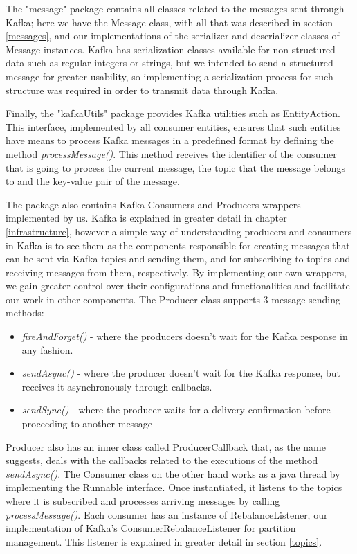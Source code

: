\documentclass[12pt]{article}
\begin{document}
The "message" package contains all classes related to the messages sent through Kafka; here we have the Message class, with all that was described in section 
\ref{messages}, and our implementations of the serializer and deserializer classes of Message instances.
Kafka has serialization classes available for non-structured data such as regular integers or strings, but we intended to send a structured message for greater 
usability, so implementing a serialization process for such structure was required in order to transmit data through Kafka.

Finally, the "kafkaUtils" package provides Kafka utilities such as EntityAction.
This interface, implemented by all consumer entities, ensures that such entities have means to process Kafka messages in a predefined format by defining the 
method \textit{processMessage()}.
This method receives the identifier of the consumer that is going to process the current message, the topic that the message belongs to and the key-value pair of 
the message.

The package also contains Kafka Consumers and Producers wrappers implemented by us.
Kafka is explained in greater detail in chapter \ref{infrastructure}, however a simple way of understanding producers and consumers in Kafka is to see them as 
the components responsible for creating messages that can be sent via Kafka topics and sending them, and for subscribing to topics and receiving messages from them,
respectively.
By implementing our own wrappers, we gain greater control over their configurations and functionalities and facilitate our work in other components.
The Producer class supports 3 message sending methods:
\vspace{-10pt}
\begin{itemize}[noitemsep]
  \item \textit{fireAndForget()} - where the producers doesn't wait for the Kafka response in any fashion.
  \item \textit{sendAsync()} - where the producer doesn't wait for the Kafka response, but receives it asynchronously through callbacks.
  \item \textit{sendSync()} - where the producer waits for a delivery confirmation before proceeding to another message
\end{itemize}
\vspace{-10pt}
Producer also has an inner class called ProducerCallback that, as the name suggests, deals with the callbacks related to the executions of the method \textit{sendAsync()}.
The Consumer class on the other hand works as a java thread by implementing the Runnable interface.
Once instantiated, it listens to the topics where it is subscribed and processes arriving messages by calling \textit{processMessage()}.
Each consumer has an instance of RebalanceListener, our implementation of Kafka's ConsumerRebalanceListener for partition management.
This listener is explained in greater detail in section \ref{topics}.
\end{document}
